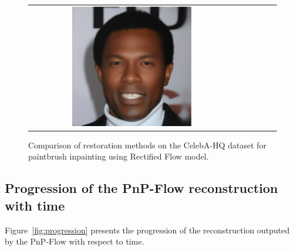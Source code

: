 \documentclass{article} %
\theoremstyle{definition}
\begin{document}
\begin{figure}[htp]
\begin{adjustbox}{max width=1.0\textwidth}
\begin{tabular}{cccccc}
\includegraphics[width=0.6\textwidth]{figures/celebahq/paintbrush_inpainting_pnp_flow_batch3_im0_iterfinal_pnsr25.61.pdf} 
    \end{tabular}
    \end{adjustbox}
    \caption{Comparison of restoration methods on the CelebA-HQ dataset for paintbrush inpainting using Rectified Flow model. \label{fig:rectified_inpainting}}
\end{figure}



\subsection{Progression of the PnP-Flow reconstruction with time}\label{sec:app_progression}


Figure~\ref{fig:progression} presents the progression of the reconstruction outputed by the PnP-Flow with respect to time. 
\end{document}
